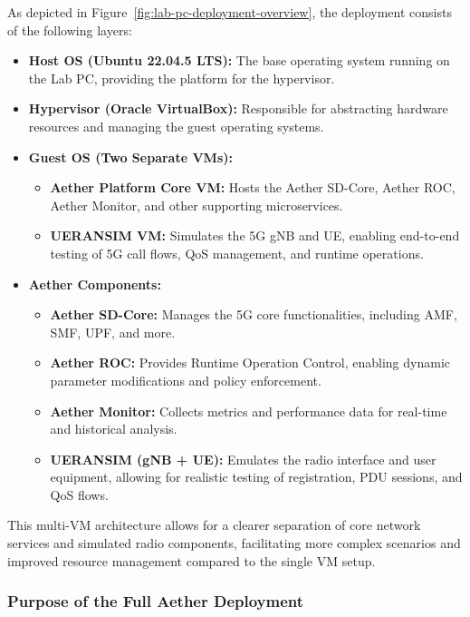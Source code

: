 As depicted in Figure~\ref{fig:lab-pc-deployment-overview}, the deployment consists of the following layers:

\begin{itemize}
    \item \textbf{Host OS (Ubuntu 22.04.5 LTS):} 
    The base operating system running on the Lab PC, providing the platform for the hypervisor.
    \item \textbf{Hypervisor (Oracle VirtualBox):} 
    Responsible for abstracting hardware resources and managing the guest operating systems.
    \item \textbf{Guest OS (Two Separate VMs):} 
    \begin{itemize}
        \item \textbf{Aether Platform Core VM:} 
        Hosts the Aether SD-Core, Aether ROC, Aether Monitor, and other supporting microservices. 
        \item \textbf{UERANSIM VM:} 
        Simulates the 5G gNB and UE, enabling end-to-end testing of 5G call flows, QoS management, and runtime operations.
    \end{itemize}
    \item \textbf{Aether Components:} 
    \begin{itemize}
        \item \textbf{Aether SD-Core:} 
        Manages the 5G core functionalities, including AMF, SMF, UPF, and more.
        \item \textbf{Aether ROC:} 
        Provides Runtime Operation Control, enabling dynamic parameter modifications and policy enforcement.
        \item \textbf{Aether Monitor:} 
        Collects metrics and performance data for real-time and historical analysis.
        \item \textbf{UERANSIM (gNB + UE):} 
        Emulates the radio interface and user equipment, allowing for realistic testing of registration, PDU sessions, and QoS flows.
    \end{itemize}
\end{itemize}

This multi-VM architecture allows for a clearer separation of core network services and simulated radio components, facilitating more complex scenarios and improved resource management compared to the single VM setup.

\subsubsection{Purpose of the Full Aether Deployment}

